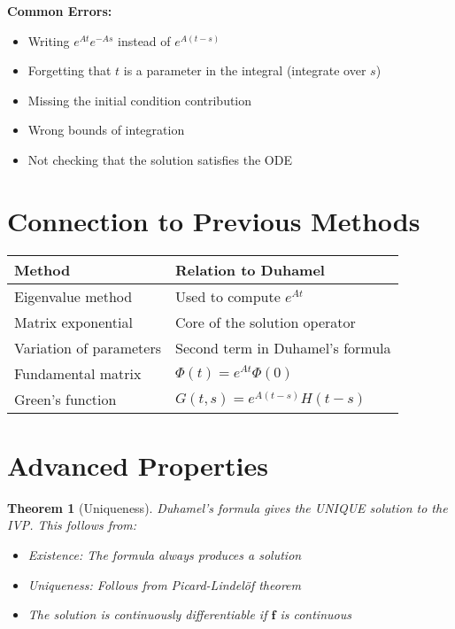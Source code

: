 \documentclass[12pt]{article}
\newtheorem{theorem}{Theorem}
\begin{document}
\begin{warning}
\textbf{Common Errors:}
\begin{itemize}
\item Writing $e^{At}e^{-As}$ instead of $e^{A(t-s)}$
\item Forgetting that $t$ is a parameter in the integral (integrate over $s$)
\item Missing the initial condition contribution
\item Wrong bounds of integration
\item Not checking that the solution satisfies the ODE
\end{itemize}
\end{warning}

\section{Connection to Previous Methods}

\begin{center}
\begin{tabular}{|l|l|}
\hline
\textbf{Method} & \textbf{Relation to Duhamel} \\
\hline
Eigenvalue method & Used to compute $e^{At}$ \\
Matrix exponential & Core of the solution operator \\
Variation of parameters & Second term in Duhamel's formula \\
Fundamental matrix & $\Phi(t) = e^{At}\Phi(0)$ \\
Green's function & $G(t,s) = e^{A(t-s)}H(t-s)$ \\
\hline
\end{tabular}
\end{center}

\section{Advanced Properties}

\begin{theorem}[Uniqueness]
Duhamel's formula gives the UNIQUE solution to the IVP. This follows from:
\begin{itemize}
\item Existence: The formula always produces a solution
\item Uniqueness: Follows from Picard-Lindelöf theorem
\item The solution is continuously differentiable if $\mathbf{f}$ is continuous
\end{itemize}
\end{theorem}
\end{document}
